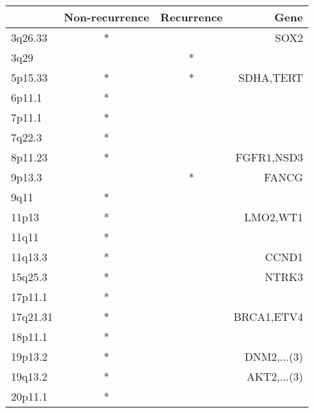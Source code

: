 \begin{tabular}{lccr}
\toprule
{} & Non-recurrence & Recurrence &         Gene \\
\midrule
3q26.33  &              * &            &         SOX2 \\
3q29     &                &          * &              \\
5p15.33  &              * &          * &    SDHA,TERT \\
6p11.1   &              * &            &              \\
7p11.1   &              * &            &              \\
7q22.3   &              * &            &              \\
8p11.23  &              * &            &   FGFR1,NSD3 \\
9p13.3   &                &          * &        FANCG \\
9q11     &              * &            &              \\
11p13    &              * &            &     LMO2,WT1 \\
11q11    &              * &            &              \\
11q13.3  &              * &            &        CCND1 \\
15q25.3  &              * &            &        NTRK3 \\
17p11.1  &              * &            &              \\
17q21.31 &              * &            &   BRCA1,ETV4 \\
18p11.1  &              * &            &              \\
19p13.2  &              * &            &  DNM2,...(3) \\
19q13.2  &              * &            &  AKT2,...(3) \\
20p11.1  &              * &            &              \\
\bottomrule
\end{tabular}
